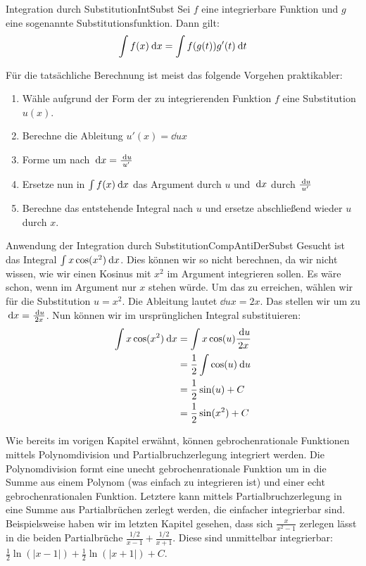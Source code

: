 \begin{statement}{Integration durch Substitution}{IntSubst}
    Sei $f$ eine integrierbare Funktion und $g$ eine sogenannte Substitutionsfunktion. Dann gilt:
    $$
        \int f(x) \:\mathrm{d}{x} = \int f(g(t)) g'(t) \:\mathrm{d}{t}
    $$
\end{statement}

Für die tatsächliche Berechnung ist meist das folgende Vorgehen praktikabler:

\begin{enumerate}
    \item Wähle aufgrund der Form der zu integrierenden Funktion $f$ eine Substitution $u(x)$.
    \item Berechne die Ableitung $u'(x) = \dd{u}{x}$
    \item Forme um nach $\:\mathrm{d}{}{x} = \frac{\:\mathrm{d}{u}}{u'}$
    \item Ersetze nun in $\int f(x) \:\mathrm{d}{x}$ das Argument durch $u$ und $\:\mathrm{d}{x}$ durch $\frac{\:\mathrm{d}{u}}{u'}$
    \item Berechne das entstehende Integral nach $u$ und ersetze abschließend wieder $u$ durch $x$.
\end{enumerate}

\begin{example}{Anwendung der Integration durch Substitution}{CompAntiDerSubst}
    Gesucht ist das Integral $\int x \cos(x^2) \:\mathrm{d}{x}$. Dies können wir so nicht berechnen, da wir nicht wissen, wie wir einen Kosinus mit $x^2$ im Argument integrieren sollen. Es wäre schon, wenn im Argument nur $x$ stehen würde. Um das zu erreichen, wählen wir für die Substitution $u = x^2$. Die Ableitung lautet $\dd{u}{x} = 2x$. Das stellen wir um zu $\:\mathrm{d}{x} = \frac{\:\mathrm{d}{u}}{2x}$. Nun können wir im ursprünglichen Integral substituieren:
    \begin{alignat*}{1}
        \int x \cos(x^2) \:\mathrm{d}{x} &= \int x \cos(u) \frac{\:\mathrm{d}{u}}{2x} \\
                                  &= \frac{1}{2} \int \cos(u) \:\mathrm{d}{u} \\
                                  &= \frac{1}{2} \sin(u) + C \\
                                  &= \frac{1}{2} \sin(x^2) + C
    \end{alignat*}
\end{example}

Wie bereits im vorigen Kapitel erwähnt, können gebrochenrationale Funktionen mittels Polynomdivision und Partialbruchzerlegung integriert werden. Die Polynomdivision formt eine unecht gebrochenrationale Funktion um in die Summe aus einem Polynom (was einfach zu integrieren ist) und einer echt gebrochenrationalen Funktion. Letztere kann mittels Partialbruchzerlegung in eine Summe aus Partialbrüchen zerlegt werden, die einfacher integrierbar sind. Beispielsweise haben wir im letzten Kapitel gesehen, dass sich $\frac{x}{x^2-1}$ zerlegen lässt in die beiden Partialbrüche $\frac{1/2}{x-1} + \frac{1/2}{x+1}$. Diese sind unmittelbar integrierbar: $\frac{1}{2}\ln(|x-1|) + \frac{1}{2} \ln(|x+1|) + C$.

